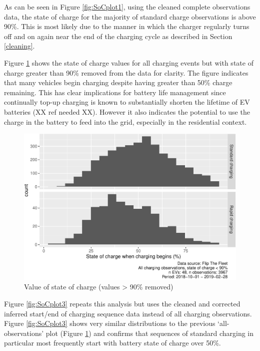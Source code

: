 \documentclass[]{article}
\begin{document}
As can be seen in Figure \ref{fig:SoCplot1}, using the cleaned complete observations data, the state of charge for the majority of standard charge observations is above 90\%. This is most likely due to the manner in which the charger regularly turns off and on again near the end of the charging cycle as described in Section \ref{cleaning}.

Figure \ref{fig:SoCplot2} shows the state of charge values for all charging events but with state of charge greater than 90\% removed from the data for clarity. The figure indicates that many vehicles begin charging despite having greater than 50\% charge remaining. This has clear implications for battery life management since continually top-up charging is known to substantially shorten the lifetime of EV batteries (XX ref needed XX). However it also indicates the potential to use the charge in the battery to feed into the grid, especially in the residential context.

\begin{figure}
\centering
\includegraphics{EVBB_report_v1_files/figure-latex/SoCplot2-1.pdf}
\caption{\label{fig:SoCplot2}Value of state of charge (values \textgreater{} 90\% removed)}
\end{figure}

Figure \ref{fig:SoCplot3} repeats this analysis but uses the cleaned and corrected inferred start/end of charging sequence data instead of all charging observations. Figure \ref{fig:SoCplot3} shows very similar distributions to the previous `all-observations' plot (Figure \ref{fig:SoCplot2}) and confirms that sequences of standard charging in particular most frequently start with battery state of charge over 50\%.
\end{document}
